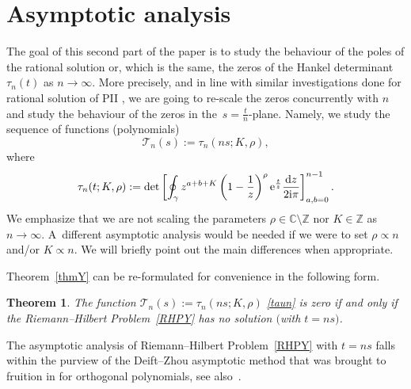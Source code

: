 \documentclass[10pt,a4paper]{amsart}
\numberwithin{equation}{section}
\newtheorem{Theorem}{Theorem}[section]
\theoremstyle{definition}
\def\le{\left}
\def\ri{\right}
\def \d{{\mathrm d}}
\def\be{\begin{equation}}
\def\ee{\end{equation}}
\def\C{{\mathbb C}}
\def\Z{{\mathbb Z}}
\def\la{\label}
\begin{document}
 \section{Asymptotic analysis}
 The goal of this second part of the paper is to study the behaviour of the poles of the rational solution or, which is the same, the zeros of the Hankel determinant $\tau_n(t)$ as $n\to \infty$.
 More precisely, and in line with similar investigations done for rational solution of PII \cite{BertolaBothner,BuckMill14, BuckMill15},
 we are going to re-scale the zeros concurrently with $n$ and study the behaviour of the zeros in the~$s =\frac t n $-plane. Namely, we study the sequence of functions (polynomials)
 \be
 \la{taun}
 \mathcal T_n(s):= \tau_n(ns; {K}, { {\rho}}),
 \ee
 where
 \[
 \tau_n(t;{K}, { {\rho}}) := \det\le[
 \oint_\gamma z^{a+b+{K}} \le(1-\frac 1 z\ri)^{ {\rho}} {\rm e}^{\frac t z}\frac{\d z}{2{\rm i}\pi}
 \ri]_{a,b=0}^{n-1}.
 \]
 We emphasize that we are not scaling the parameters ${ {\rho}}\in \C\setminus \Z$ nor $K\in \Z$ as $n\to\infty$. A~different asymptotic analysis would be needed if we were to set ${ {\rho}} \propto n$ and/or $K\propto n$. We will briefly point out the main differences when appropriate.

Theorem~\ref{thmY} can be re-formulated for convenience in the following form.
\begin{Theorem} \label{thmYres}
 The function $\mathcal T_n(s):= \tau_n(ns; K, { {\rho}})$ \eqref{taun} is zero if and only if the Riemann--Hilbert Problem~{\rm\ref{RHPY}} has no solution $($with $t= ns)$.
 \end{Theorem}
 The asymptotic analysis of Riemann--Hilbert Problem~\ref{RHPY} with $t=ns$ falls within the purview of the Deift--Zhou asymptotic method that was brought to fruition in \cite{DKMVZ} for orthogonal polynomials, see also~\cite{BleherIts, Deiftbook}.
\end{document}
